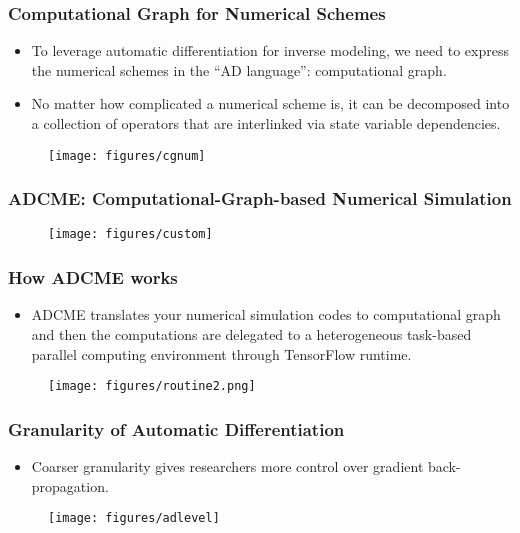 \documentclass[usenames,dvipsnames]{beamer}
\begin{document}
\begin{frame}
	\frametitle{Computational Graph for Numerical Schemes}
	
	\begin{itemize}
		\item To leverage automatic differentiation for inverse modeling, we need to express the numerical schemes in the ``AD language'': computational graph. 
		\item No matter how complicated a numerical scheme is, it can be decomposed into a collection of operators that are interlinked via state variable dependencies. 
	\end{itemize}
	
	\begin{figure}[hbt]
		\texttt{[image: figures/cgnum]}
	\end{figure}
	
	
	
\end{frame}


\begin{frame}
	\frametitle{ADCME: Computational-Graph-based Numerical Simulation}
	
	\begin{figure}[hbt]
		\texttt{[image: figures/custom]}
	\end{figure}
\end{frame}

\begin{frame}
\frametitle{How ADCME works}
\begin{itemize}
	\item ADCME translates your numerical simulation codes to computational graph and then the computations are delegated to a heterogeneous task-based parallel computing environment through TensorFlow runtime. 
\end{itemize}
\begin{figure}[hbt]
	\texttt{[image: figures/routine2.png]}
\end{figure}
\end{frame}


\begin{frame}
	\frametitle{Granularity of Automatic Differentiation}
	
	\begin{itemize}
		\item Coarser granularity gives researchers more control over gradient back-propagation. 
	\end{itemize}
	
	
	\begin{figure}[hbt]
		\centering
		\texttt{[image: figures/adlevel]}
	\end{figure}
	
	
	
\end{frame}
\end{document}
